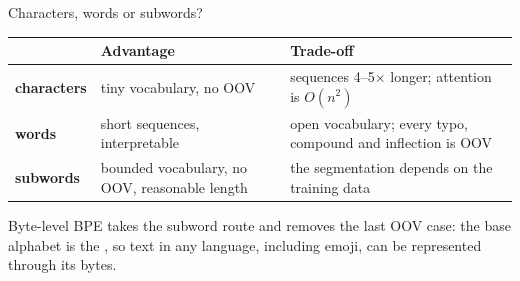 \documentclass[aspectratio=169,10pt]{beamer}
\begin{document}
\begin{frame}{Characters, words or subwords?}
  \centering
  \begin{tabular}{@{}l L{4.2cm} L{4.6cm}@{}}
    \toprule
    & \textbf{Advantage} & \textbf{Trade-off}\\
    \midrule
    \textbf{characters} & tiny vocabulary, no OOV & sequences 4--5$\times$ longer;
      attention is $O(n^2)$ \\
    \textbf{words} & short sequences, interpretable & open vocabulary; every typo,
      compound and inflection is OOV \\
    \textbf{subwords} & bounded vocabulary, no OOV, reasonable length & the
      segmentation depends on the training data \\
    \bottomrule
  \end{tabular}
  \vspace{1.0em}

  Byte-level BPE takes the subword route and removes the last OOV case:
  the base alphabet is the , so text in any language,
  including emoji, can be represented through its bytes.
\end{frame}
\end{document}
